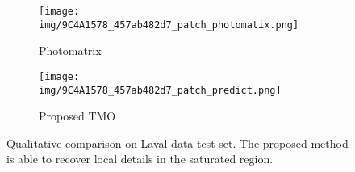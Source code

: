 \documentclass[journal]{IEEEtran}
\begin{document}
\begin{figure*}[t]
\begin{subfigure}[b]{0.24\textwidth}
        \end{subfigure}
        \begin{subfigure}[b]{0.24\textwidth}   
            \centering 
            \texttt{[image: img/9C4A1578\_457ab482d7\_patch\_photomatix.png]}
            \caption[]%
            {{\small Photomatrix \cite{photomatrix} }}    
            \label{fig:mean and std of net34}
        \end{subfigure}
        \begin{subfigure}[b]{0.24\textwidth}   
            \centering 
            \texttt{[image: img/9C4A1578\_457ab482d7\_patch\_predict.png]}
            \caption[]%
            {{\small Proposed TMO}}    
            \label{fig:mean and std of net44}
        \end{subfigure}
        \caption{Qualitative comparison on Laval data test set. The proposed method is able to recover local details in the saturated region.}
        \label{fig:Laval_9C4A1578_457ab482d7}
\end{figure*} 
\end{document}
